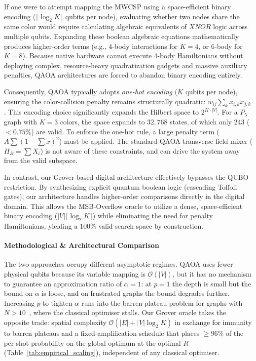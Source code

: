 \documentclass{ieeeaccess}
\begin{document}
If one were to attempt mapping the MWCSP using a space-efficient binary encoding ($\lceil \log_2 K \rceil$ qubits per node), evaluating whether two nodes share the same color would require calculating algebraic equivalents of $XNOR$ logic across multiple qubits. Expanding these boolean algebraic equations mathematically produces higher-order terms (e.g., 4-body interactions for $K=4$, or 6-body for $K=8$). Because native hardware cannot execute 4-body Hamiltonians without deploying complex, resource-heavy quadratization gadgets and massive auxiliary penalties, QAOA architectures are forced to abandon binary encoding entirely.

Consequently, QAOA typically adopts \textit{one-hot encoding} ($K$ qubits per node), ensuring the color-collision penalty remains structurally quadratic: $w_{ij} \sum_k x_{i,k} x_{j,k}$. This encoding choice significantly expands the Hilbert space to $2^{K \cdot |V|}$. For a $P_5$ graph with $K=3$ colors, the space expands to $32{,}768$ states, of which only $243$ ($<0.75\%$) are valid. To enforce the one-hot rule, a large penalty term ($A \sum (1 - \sum x)^2$) must be applied. The standard QAOA transverse-field mixer ($H_B = \sum X_i$) is not aware of these constraints, and can drive the system away from the valid subspace.

In contrast, our Grover-based digital architecture effectively bypasses the QUBO restriction. By synthesizing explicit quantum boolean logic (cascading Toffoli gates), our architecture handles higher-order comparisons directly in the digital domain. This allows the MSB-Overflow oracle to utilize a dense, space-efficient binary encoding ($|V|\lceil \log_2 K \rceil$) while eliminating the need for penalty Hamiltonians, yielding a $100\%$ valid search space by construction.

\paragraph{Methodological \& Architectural Comparison}
The two approaches occupy different asymptotic regimes. QAOA uses fewer physical qubits because its variable mapping is $\mathcal{O}(|V|)$, but it has no mechanism to guarantee an approximation ratio of $\alpha = 1$: at $p{=}1$ the depth is small but the bound on $\alpha$ is loose, and on frustrated graphs the bound degrades further. Increasing $p$ to tighten $\alpha$ runs into the barren-plateau problem for graphs with $N > 10$~\cite{mcclean2018barren}, where the classical optimiser stalls. Our Grover oracle takes the opposite trade: spatial complexity $\mathcal{O}(|E| + |V|\log_2 K)$ in exchange for immunity to barren plateaus and a fixed-amplification schedule that places $\ge 96\%$ of the per-shot probability on the global optimum at the optimal $R$ (Table~\ref{tab:empirical_scaling}), independent of any classical optimiser.
\end{document}
